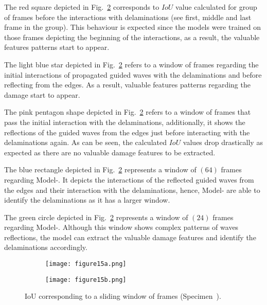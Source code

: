 The red square depicted in Fig.~\ref{fig:L3_S4_B_333x333p_50kHz_5HC_shapes_} corresponds to \(IoU\) value calculated for group of frames before the interactions with delaminations (see first, middle and last frame in the group).
This behaviour is expected since the models were trained on those frames depicting the beginning of the interactions, as a result, the valuable features patterns start to appear.

The light blue star depicted in Fig.~\ref{fig:L3_S4_B_333x333p_50kHz_5HC_shapes_} refers to a window of frames regarding the initial interactions of propagated guided waves with the delaminations and before reflecting from the edges.
As a result, valuable features patterns regarding the damage start to appear.

The pink pentagon shape depicted in Fig.~\ref{fig:L3_S4_B_333x333p_50kHz_5HC_shapes_} refers to a window of frames that pass the initial interaction with the delaminations, additionally, it shows the reflections of the guided waves from the edges just before interacting with the delaminations again.
As can be seen, the calculated \(IoU\) values drop drastically as expected as there are no valuable damage features to be extracted. 

The blue rectangle depicted in Fig.~\ref{fig:L3_S4_B_333x333p_50kHz_5HC_shapes_} represents a window of \((64)\) frames regarding Model-.
It depicts the interactions of the reflected guided waves from the edges and their interaction with the delaminations, hence, Model- are able to identify the delaminations as it has a larger window.

The green circle depicted in Fig.~\ref{fig:L3_S4_B_333x333p_50kHz_5HC_shapes_} represents a window of \((24)\) frames regarding Model-.
Although this window shows complex patterns of waves reflections, the model can extract the valuable damage features and identify the delaminations accordingly.
\begin{figure} [!h]
	\centering
	\begin{subfigure}[b]{1\textwidth}
		\centering
		\texttt{[image: figure15a.png]}
		\caption{}
		\label{fig:L3_S4_B_333x333p_50kHz_5HC_IoU}
	\end{subfigure}
	\par\medskip
	\begin{subfigure}[b]{1\textwidth}
		\centering
		\texttt{[image: figure15b.png]}
		\caption{} 
		\label{fig:L3_S4_B_333x333p_50kHz_5HC_shapes_}
	\end{subfigure}
	\caption{IoU corresponding to a sliding window of frames (Specimen~).}
	\label{fig:L3_S4_B_333x333p_50kHz_5HC_IoU_centre_window}
\end{figure} 

